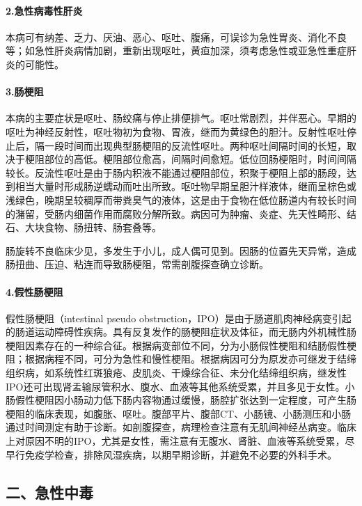 \paragraph{2.急性病毒性肝炎}

本病可有纳差、乏力、厌油、恶心、呕吐、腹痛，可误诊为急性胃炎、消化不良等；如急性肝炎病情加剧，重新出现呕吐，黄疸加深，须考虑急性或亚急性重症肝炎的可能性。

\paragraph{3.肠梗阻}

本病的主要症状是呕吐、肠绞痛与停止排便排气。呕吐常剧烈，并伴恶心。早期的呕吐为神经反射性，呕吐物初为食物、胃液，继而为黄绿色的胆汁。反射性呕吐停止后，隔一段时间而出现典型肠梗阻的反流性呕吐。两种呕吐间隔时间的长短，取决于梗阻部位的高低。梗阻部位愈高，间隔时间愈短。低位回肠梗阻时，时间间隔较长。反流性呕吐是由于肠内积液不能通过梗阻部位，积聚于梗阻上部的肠段，达到相当大量时形成肠逆蠕动而吐出所致。呕吐物早期呈胆汁样液体，继而呈棕色或浅绿色，晚期呈较稠厚而带粪臭气的液体，这是由于食物在低位肠道内有较长时间的潴留，受肠内细菌作用而腐败分解所致。病因可为肿瘤、炎症、先天性畸形、结石、大块食物、肠扭转、肠套叠等。

肠旋转不良临床少见，多发生于小儿，成人偶可见到。因肠的位置先天异常，造成肠扭曲、压迫、粘连而导致肠梗阻，常需剖腹探查确立诊断。

\paragraph{4.假性肠梗阻}

假性肠梗阻（intestinal pseudo
obstruction，IPO）是由于肠道肌肉神经病变引起的肠道运动障碍性疾病。具有反复发作的肠梗阻症状及体征，而无肠内外机械性肠梗阻因素存在的一种综合征。根据病变部位不同，分为小肠假性梗阻和结肠假性梗阻；根据病程不同，可分为急性和慢性梗阻。根据病因可分为原发亦可继发于结缔组织病，如系统性红斑狼疮、皮肌炎、干燥综合征、未分化结缔组织病，继发性IPO还可出现肾盂输尿管积水、腹水、血液等其他系统受累，并且多见于女性。小肠假性梗阻因小肠动力低下肠内容物通过缓慢，肠腔扩张达到一定程度，可产生肠梗阻的临床表现，如腹胀、呕吐。腹部平片、腹部CT、小肠镜、小肠测压和小肠通过时间测定有助于诊断。如剖腹探查，病理检查注意有无肌间神经丛病变。临床上对原因不明的IPO，尤其是女性，需注意有无腹水、肾脏、血液等系统受累，尽早行免疫学检查，排除风湿疾病，以期早期诊断，并避免不必要的外科手术。

\subsection{二、急性中毒}

